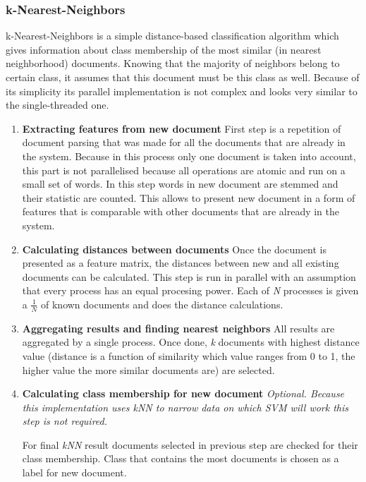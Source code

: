 \subsubsection{k-Nearest-Neighbors}
k-Nearest-Neighbors is a simple distance-based classification algorithm which gives information about class membership of the most similar (in nearest neighborhood) documents. Knowing that the majority of neighbors belong to certain class, it assumes that this document must be this class as well. Because of its simplicity its parallel implementation is not complex and looks very similar to the single-threaded one.

\begin{enumerate}
	\item \textbf{Extracting features from new document}\newline
	First step is a repetition of document parsing that was made for all the documents that are already in the system. Because in this process only one document is taken into account, this part is not parallelised because all operations are atomic and run on a small set of words. In this step words in new document are stemmed and their statistic are counted. This allows to present new document in a form of features that is comparable with other documents that are already in the system.
	
	\item \textbf{Calculating distances between documents}\newline
	Once the document is presented as a feature matrix, the distances between new and all existing documents can be calculated. This step is run in parallel with an assumption that every process has an equal procesing power. Each of \textit{N} processes is given a \(\frac{1}{N}\) of known documents and does the distance calculations.
	
	\item \textbf{Aggregating results and finding nearest neighbors}\newline
	All results are aggregated by a single process. Once done, \textit{k} documents with highest distance value (distance is a function of similarity which value ranges from 0 to 1, the higher value the more similar documents are) are selected.
	
	\item \textbf{Calculating class membership for new document}\newline
	\textit{Optional. Because this implementation uses \textit{kNN} to narrow data on which \textit{SVM} will work this step is not required.}
	
	For final \textit{kNN} result documents selected in previous step are checked for their class membership. Class that contains the most documents is chosen as a label for new document.
	
\end{enumerate}
